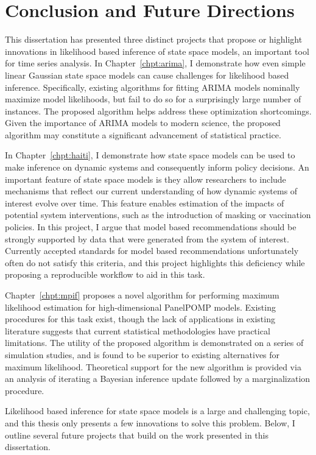 \chapter{Conclusion and Future Directions}
\label{chpt:conclusion}

This dissertation has presented three distinct projects that propose or highlight innovations in likelihood based inference of state space models, an important tool for time series analysis.
In Chapter~\ref{chpt:arima}, I demonstrate how even simple linear Gaussian state space models can cause challenges for likelihood based inference.
Specifically, existing algorithms for fitting ARIMA models nominally maximize model likelihoods, but fail to do so for a surprisingly large number of instances.
The proposed algorithm helps address these optimization shortcomings.
Given the importance of ARIMA models to modern science, the proposed algorithm may constitute a significant advancement of statistical practice.

In Chapter~\ref{chpt:haiti}, I demonstrate how state space models can be used to make inference on dynamic systems and consequently inform policy decisions.
An important feature of state space models is they allow researchers to include mechanisms that reflect our current understanding of how dynamic systems of interest evolve over time.
This feature enables estimation of the impacts of potential system interventions, such as the introduction of masking or vaccination policies.
In this project, I argue that model based recommendations should be strongly supported by data that were generated from the system of interest.
Currently accepted standards for model based recommendations unfortunately often do not satisfy this criteria, and this project highlights this deficiency while proposing a reproducible workflow to aid in this task.

Chapter~\ref{chpt:mpif} proposes a novel algorithm for performing maximum likelihood estimation for high-dimensional PanelPOMP models.
Existing procedures for this task exist, though the lack of applications in existing literature suggests that current statistical methodologies have practical limitations.
The utility of the proposed algorithm is demonstrated on a series of simulation studies, and is found to be superior to existing alternatives for maximum likelihood.
Theoretical support for the new algorithm is provided via an analysis of iterating a Bayesian inference update followed by a marginalization procedure.

Likelihood based inference for state space models is a large and challenging topic, and this thesis only presents a few innovations to solve this problem.
Below, I outline several future projects that build on the work presented in this dissertation.

